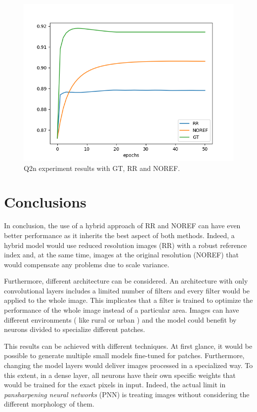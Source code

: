 \documentclass[12pt]{report}
\begin{document}
\begin{figure}[t]
    \centering
    \includegraphics[scale=.7]{toulouse_gt_rr_noref.png}
    \caption{Q2n experiment results with GT, RR and NOREF.}
    \label{fig:gt_rr_noref}
\end{figure}

\chapter{Conclusions}


In conclusion, the use of a hybrid approach of RR and NOREF can have even better performance as it inherits the best aspect of both methods.
Indeed, a hybrid model would use reduced resolution images (RR) with a robust reference index
and, at the same time, images at the original resolution (NOREF) that 
would compensate any problems due to scale variance.

Furthermore, different architecture can be considered.
An architecture with only convolutional layers includes a limited number of filters and every filter would be applied to the whole image.
This implicates that a filter is trained to optimize the performance of the whole image instead of a particular area.
Images can have different environments ( like rural or urban ) and the model could benefit by neurons divided to specialize different patches.

This results can be achieved with different techniques.
At first glance, it would be possible to generate multiple small models fine-tuned for patches.
Furthermore, changing the model layers would deliver images processed in a specialized way.
To this extent, in a dense layer, all neurons have their own specific weights that would be trained for the exact pixels in input.
Indeed, the actual limit in \textit{pansharpening neural networks} (PNN) is treating images without considering the different morphology of them.
\end{document}
